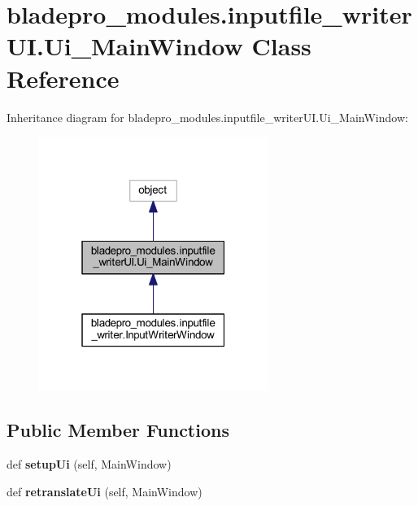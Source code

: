 \hypertarget{a00077}{}\section{bladepro\+\_\+modules.\+inputfile\+\_\+writer\+U\+I.\+Ui\+\_\+\+Main\+Window Class Reference}
\label{a00077}


Inheritance diagram for bladepro\+\_\+modules.\+inputfile\+\_\+writer\+U\+I.\+Ui\+\_\+\+Main\+Window\+:
\nopagebreak
\begin{figure}[H]
\begin{center}
\leavevmode
\includegraphics[width=211pt]{a00076}
\end{center}
\end{figure}
\subsection*{Public Member Functions}
\begin{DoxyCompactItemize}
\item 
\hypertarget{a00077_a77688f6f653ba2711e93269a03753754}{}\label{a00077_a77688f6f653ba2711e93269a03753754} 
def {\bfseries setup\+Ui} (self, Main\+Window)
\item 
\hypertarget{a00077_a640f34d5228b66fcf4118eaa17edf8d6}{}\label{a00077_a640f34d5228b66fcf4118eaa17edf8d6} 
def {\bfseries retranslate\+Ui} (self, Main\+Window)
\end{DoxyCompactItemize}
